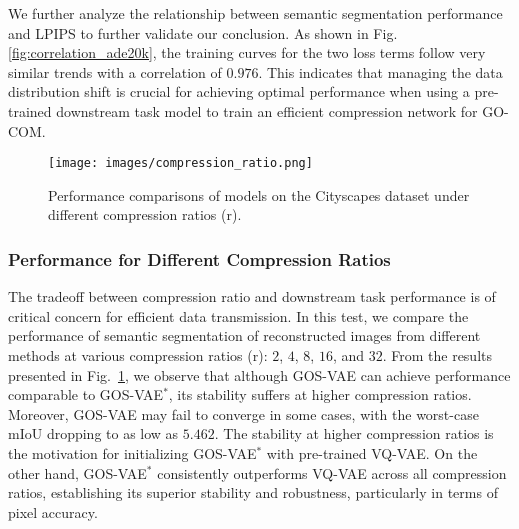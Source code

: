 We further analyze the relationship between semantic segmentation performance and LPIPS to further validate our conclusion. As shown in Fig. \ref{fig:correlation_ade20k}, the training curves for the two loss terms follow very similar trends with a correlation of $0.976$. This indicates that managing the data distribution shift is crucial for achieving optimal performance when using a pre-trained downstream task model to train an efficient compression network for GO-COM.

\begin{figure}[htb]
\centering
\vspace{-1mm}
\texttt{[image: images/compression\_ratio.png]}
\caption{Performance comparisons of models on the Cityscapes dataset under different compression ratios (r).}
\label{fig:compression_ratio}\vspace*{-2mm}
\end{figure}


\subsubsection{Performance for Different Compression Ratios}
The tradeoff between compression ratio and downstream task performance is of critical concern for efficient data transmission. In this test, we compare the performance of semantic segmentation of reconstructed images from different methods at various compression ratios (r):  $2$, $4$, $8$, $16$, and $32$. 
From the results presented in 
Fig.~\ref{fig:compression_ratio}, we observe that although GOS-VAE can achieve performance comparable to GOS-VAE$^{*}$, its stability 
suffers at higher compression ratios. Moreover, GOS-VAE may fail to converge in some cases, with the worst-case mIoU dropping to as low as $5.462$. The stability at higher compression ratios is the motivation for initializing GOS-VAE$^{*}$ with pre-trained VQ-VAE. On the other hand, GOS-VAE$^{*}$ consistently outperforms VQ-VAE across all compression ratios, establishing its
superior stability and robustness, particularly in terms of pixel accuracy.







